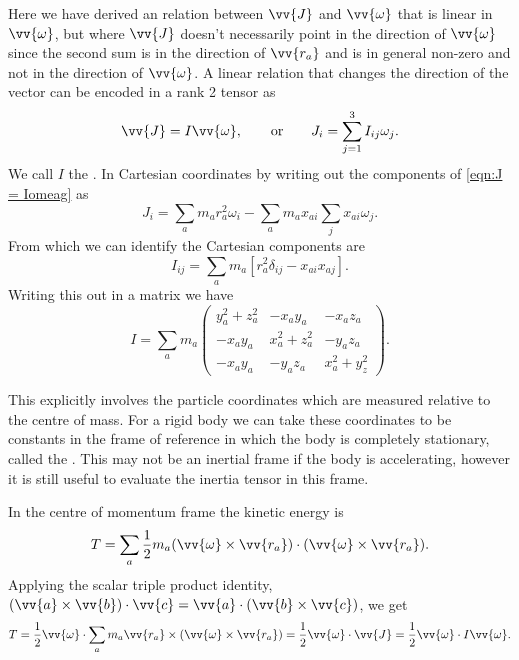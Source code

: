 \documentclass[fleqn]{NotesClass}
\begin{document}
    Here we have derived an relation between \(\vv{J}\) and \(\vv{\omega}\) that is linear in \(\vv{\omega}\), but where \(\vv{J}\) doesn't necessarily point in the direction of \(\vv{\omega}\) since the second sum is in the direction of \(\vv{r_a}\) and is in general non-zero and not in the direction of \(\vv{\omega}\).
    A linear relation that changes the direction of the vector can be encoded in a rank 2 tensor as
    \begin{equation}
        \vv{J} = I \vv{\omega}, \qquad \text{or} \qquad J_i = \sum_{j=1}^{3} I_{ij}\omega_j.
    \end{equation}
    We call \(I\) the .
    In Cartesian coordinates by writing out the components of \cref{eqn:J = Iomeag} as
    \begin{equation}
        J_i = \sum_a m_a r_a^2 \omega_i - \sum_a m_a x_{ai} \sum_j x_{ai}\omega_j.
    \end{equation}
    From which we can identify the Cartesian components are
    \begin{equation}\label{eqn:inertia tensor componentns}
        I_{ij} = \sum_{a} m_a [r_a^2 \delta_{ij} - x_{ai}x_{aj}].
    \end{equation}
    Writing this out in a matrix we have
    \begin{equation}
        I = \sum_a m_a 
        \begin{pmatrix}
            y_a^2 + z_a^2 & -x_ay_a & -x_az_a\\
            -x_ay_a & x_a^2 + z_a^2 & -y_az_a\\
            -x_ay_a & -y_az_a & x_a^2 + y_z^2
        \end{pmatrix}
        .
    \end{equation}
    
    This explicitly involves the particle coordinates which are measured relative to the centre of mass.
    For a rigid body we can take these coordinates to be constants in the frame of reference in which the body is completely stationary, called the .
    This may not be an inertial frame if the body is accelerating, however it is still useful to evaluate the inertia tensor in this frame.
    
    In the centre of momentum frame the kinetic energy is
    \begin{equation}
        T = \sum_a \frac{1}{2}m_a(\vv{\omega} \times \vv{r_a}) \cdot (\vv{\omega} \times \vv{r_a}).
    \end{equation}
    Applying the scalar triple product identity, \((\vv{a} \times \vv{b}) \cdot \vv{c} = \vv{a} \cdot (\vv{b} \times \vv{c})\), we get
    \begin{equation}
        T = \frac{1}{2}\vv{\omega} \cdot \sum_a m_a \vv{r_a} \times (\vv{\omega} \times \vv{r_a}) = \frac{1}{2}\vv{\omega} \cdot \vv{J} = \frac{1}{2}\vv{\omega} \cdot I\vv{\omega}.
    \end{equation}
    
\end{document}

